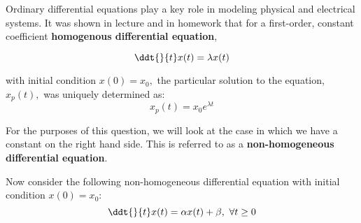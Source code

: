 


Ordinary differential equations play a key role in modeling physical and electrical systems.
It was shown in lecture and in homework that for a first-order, constant coefficient \textbf{homogenous differential equation},

\begin{equation} \label{eq:h}
\ddt{}{t} x(t) = \lambda x(t)
\end{equation}

with initial condition $x(0) = x_0,$ the particular solution to the equation, $x_p(t),$ was uniquely determined as:
\begin{equation} \label{eq:hs}
x_p(t) = x_0 e^{\lambda t}
\end{equation}

For the purposes of this question, we will look at the case in which we have a constant on the right hand side.
This is referred to as a \textbf{non-homogeneous differential equation}.

Now consider the following non-homogeneous differential equation with initial condition $x(0) = x_0$:
\begin{equation} \label{eq:nh}
    \ddt{}{t} x(t)  = \alpha x(t) + \beta, \ \forall t \geq 0
\end{equation}

